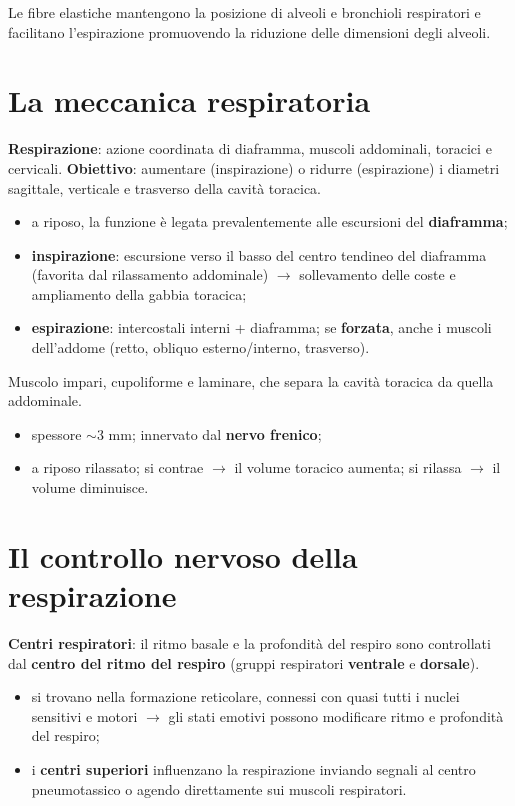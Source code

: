 Le fibre elastiche mantengono la posizione di alveoli e bronchioli respiratori e facilitano
l'espirazione promuovendo la riduzione delle dimensioni degli alveoli.

\section{La meccanica respiratoria}

\textbf{Respirazione}: azione coordinata di diaframma, muscoli addominali, toracici e cervicali.
\textbf{Obiettivo}: aumentare (inspirazione) o ridurre (espirazione) i diametri sagittale, verticale
e trasverso della cavità toracica.

\begin{itemize}
  \item a riposo, la funzione è legata prevalentemente alle escursioni del \textbf{diaframma};
  \item \textbf{inspirazione}: escursione verso il basso del centro tendineo del diaframma (favorita
    dal rilassamento addominale) $\rightarrow$ sollevamento delle coste e ampliamento della gabbia
    toracica;
  \item \textbf{espirazione}: intercostali interni + diaframma; se \textbf{forzata}, anche i muscoli
    dell'addome (retto, obliquo esterno/interno, trasverso).
\end{itemize}

Muscolo impari, cupoliforme e laminare, che separa la cavità toracica da quella addominale.
\begin{itemize}
  \item spessore $\sim$3 mm; innervato dal \textbf{nervo frenico};
  \item a riposo rilassato; si contrae $\rightarrow$ il volume toracico aumenta; si rilassa
    $\rightarrow$ il volume diminuisce.
\end{itemize}

\section{Il controllo nervoso della respirazione}

\textbf{Centri respiratori}: il ritmo basale e la profondità del respiro sono controllati dal
\textbf{centro del ritmo del respiro} (gruppi respiratori \textbf{ventrale} e \textbf{dorsale}).
\begin{itemize}
  \item si trovano nella formazione reticolare, connessi con quasi tutti i nuclei sensitivi e motori
    $\rightarrow$ gli stati emotivi possono modificare ritmo e profondità del respiro;
  \item i \textbf{centri superiori} influenzano la respirazione inviando segnali al centro
    pneumotassico o agendo direttamente sui muscoli respiratori.
\end{itemize}

